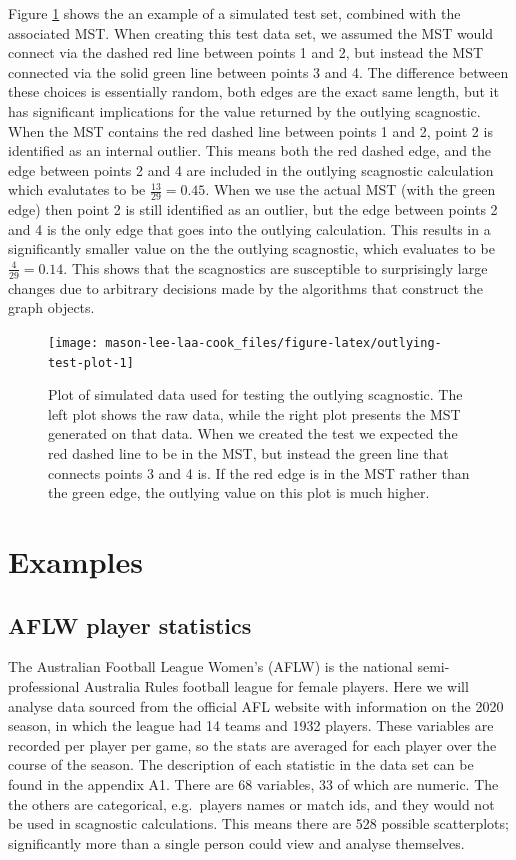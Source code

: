 Figure \ref{fig:outlying-test-plot} shows the an example of a simulated test set, combined with the associated MST. When creating this test data set, we assumed the MST would connect via the dashed red line between points 1 and 2, but instead the MST connected via the solid green line between points 3 and 4. The difference between these choices is essentially random, both edges are the exact same length, but it has significant implications for the value returned by the outlying scagnostic. When the MST contains the red dashed line between points 1 and 2, point 2 is identified as an internal outlier. This means both the red dashed edge, and the edge between points 2 and 4 are included in the outlying scagnostic calculation which evalutates to be \(\frac{13}{29}=0.45\). When we use the actual MST (with the green edge) then point 2 is still identified as an outlier, but the edge between points 2 and 4 is the only edge that goes into the outlying calculation. This results in a significantly smaller value on the the outlying scagnostic, which evaluates to be \(\frac{4}{29}=0.14\). This shows that the scagnostics are susceptible to surprisingly large changes due to arbitrary decisions made by the algorithms that construct the graph objects.

\begin{figure}
\texttt{[image: mason-lee-laa-cook\_files/figure-latex/outlying-test-plot-1]} \caption{Plot of simulated data used for testing the outlying scagnostic. The left plot shows the raw data, while the right plot presents the MST generated on that data. When we created the test we expected the red dashed line to be in the MST, but instead the green line that connects points 3 and 4 is. If the red edge is in the MST rather than the green edge, the outlying value on this plot is much higher.}\label{fig:outlying-test-plot}
\end{figure}

\section{Examples}\label{examples}

\subsection{AFLW player statistics}\label{aflw-player-statistics}

The Australian Football League Women's (AFLW) is the national semi-professional Australia Rules football league for female players. Here we will analyse data sourced from the official AFL website with information on the 2020 season, in which the league had 14 teams and 1932 players. These variables are recorded per player per game, so the stats are averaged for each player over the course of the season. The description of each statistic in the data set can be found in the appendix A1. There are 68 variables, 33 of which are numeric. The the others are categorical, e.g.~players names or match ids, and they would not be used in scagnostic calculations. This means there are 528 possible scatterplots; significantly more than a single person could view and analyse themselves.


